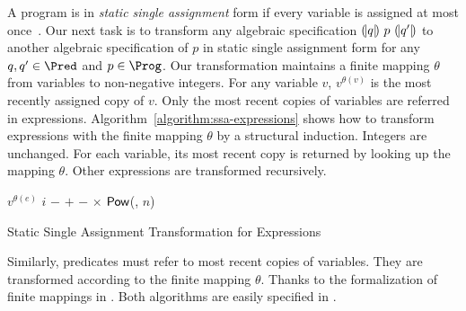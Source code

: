 
A program is in \emph{static single assignment} form if every variable
is assigned at most once~\cite{AWZ:88:DQVP}.
Our next task is to transform any algebraic specification
${(\!|}{q}{|\!)}~{p}~{(\!|}{q'}{|\!)}$ to another algebraic specification of $p$ in
static single  assignment form for any $q, q' \in \Pred$ and $p \in
\Prog$. Our transformation 
maintains a finite mapping $\theta$ from variables to
non-negative integers. For any variable $v$, $v^{\theta(v)}$ is
the most recently assigned copy of $v$. Only the most recent copies of
variables are referred in
expressions. Algorithm~\ref{algorithm:ssa-expressions} shows how 
to transform expressions with the finite mapping $\theta$ by a
structural induction. Integers are unchanged. For each variable, its
most recent copy is returned by looking up the mapping $\theta$. Other
expressions are transformed recursively. 

\begin{algorithm}
  \begin{algorithmic}[1]
       \Return $v^{\theta(e)}$ \EndCase
       \Return $i$ \EndCase
       \Return $-$ \EndCase
        \Return {} $+$ 
      \EndCase
        \Return {} $-$ 
      \EndCase
        \Return {} $\times$ 
      \EndCase
        \Return $\mbox{\textsf{Pow}}$(, $n$)
      \EndCase
    \EndMatch
    \EndFunction
  \end{algorithmic}
  \caption{Static Single Assignment Transformation for Expressions}
  \label{algorithm:ssa-expressions}
\end{algorithm}

Similarly, predicates must refer to most recent copies of 
variables. They are transformed according to the finite mapping
$\theta$. Thanks to the formalization of finite mappings in \coq. Both 
algorithms are easily specified in \gallina.


